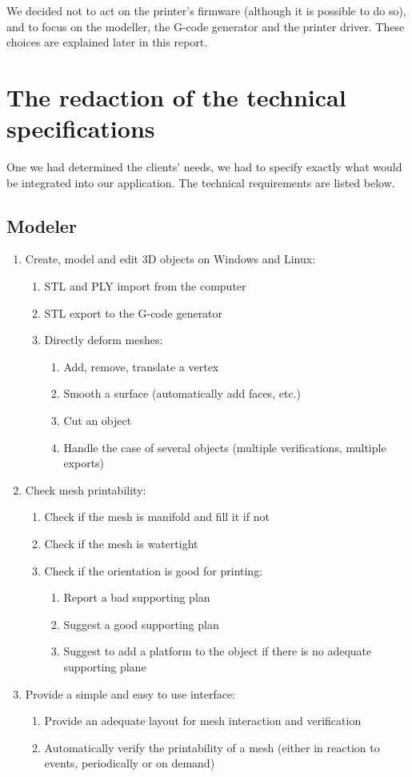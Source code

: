 \documentclass{report}
\begin{document}
We decided not to act on the printer's firmware (although it is possible to do so), and to focus on the modeller, the G-code generator and the printer driver. These choices are explained later in this report. 

\section{The redaction of the technical specifications}

One we had determined the clients' needs, we had to specify exactly what would be integrated into our application. The technical requirements are listed below.

\subsection{Modeler}
\begin{enumerate}
	\item Create, model and edit 3D objects on Windows and Linux:
	\begin{enumerate}
		\item STL and PLY import from the computer
		\item STL export to the G-code generator
		\item Directly deform meshes:
		\begin{enumerate}
			\item Add, remove, translate a vertex
			\item Smooth a surface (automatically add faces, etc.)
			\item Cut an object
			\item Handle the case of several objects (multiple verifications, multiple exports)
		\end{enumerate}
	\end{enumerate}
	\item{Check mesh printability:}
	\begin{enumerate}
		\item Check if the mesh is manifold and fill it if not
		\item Check if the mesh is watertight
		\item Check if the orientation is good for printing:
		\begin{enumerate}
			\item Report a bad supporting plan
			\item Suggest a good supporting plan
			\item Suggest to add a platform to the object if there is no adequate supporting plane
		\end{enumerate}
	\end{enumerate}
	\item{Provide a simple and easy to use interface:}
	\begin{enumerate}
		\item Provide an adequate layout for mesh interaction and verification
		\item Automatically verify the printability of a mesh (either in reaction to events, periodically or on demand)
	\end{enumerate}
\end{enumerate}
\end{document}
